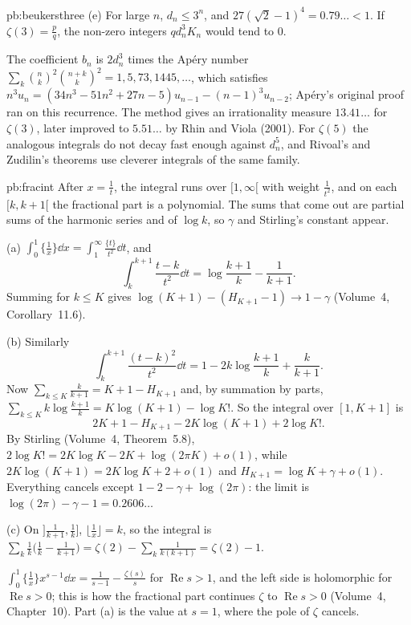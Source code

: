 \begin{solution}{pb:beukersthree}
(e) For large $n$, $d_n\le3^n$, and $27(\sqrt2-1)^4=0.79\ldots<1$. If $\zeta(3)=\frac pq$, the non-zero integers $qd_n^3K_n$ would tend to $0$.

\leads The coefficient $b_n$ is $2d_n^3$ times the Apéry number $\sum_k\binom nk^2\binom{n+k}k^2=1,5,73,1445,\dots$, which satisfies
$n^3u_n=(34n^3-51n^2+27n-5)u_{n-1}-(n-1)^3u_{n-2}$; Apéry's original proof ran on this recurrence. The method gives an irrationality
measure $13.41\ldots$ for $\zeta(3)$, later improved to $5.51\ldots$ by Rhin and Viola (2001). For $\zeta(5)$ the analogous integrals do
not decay fast enough against $d_n^5$, and Rivoal's and Zudilin's theorems use cleverer integrals of the same family.
\end{solution}

\begin{solution}{pb:fracint}
\idea After $x=\frac1t$, the integral runs over $[1,\infty[$ with weight $\frac1{t^2}$, and on each $[k,k+1[$ the fractional part is a
polynomial. The sums that come out are partial sums of the harmonic series and of $\log k$, so $\gamma$ and Stirling's constant appear.

\writeup (a) $\int_0^1\{\frac1x\}\dd x=\int_1^\infty\frac{\{t\}}{t^2}\dd t$, and
\[
\int_k^{k+1}\frac{t-k}{t^2}\dd t=\log\frac{k+1}k-\frac1{k+1}.
\]
Summing for $k\le K$ gives $\log(K+1)-(H_{K+1}-1)\to1-\gamma$ (Volume~4, Corollary~11.6).

(b) Similarly
\[
\int_k^{k+1}\frac{(t-k)^2}{t^2}\dd t=1-2k\log\frac{k+1}k+\frac k{k+1}.
\]
Now $\sum_{k\le K}\frac k{k+1}=K+1-H_{K+1}$ and, by summation by parts,
$\sum_{k\le K}k\log\frac{k+1}k=K\log(K+1)-\log K!$. So the integral over $[1,K+1]$ is
\[
2K+1-H_{K+1}-2K\log(K+1)+2\log K!.
\]
By Stirling (Volume~4, Theorem~5.8), $2\log K!=2K\log K-2K+\log(2\pi K)+o(1)$, while $2K\log(K+1)=2K\log K+2+o(1)$ and $H_{K+1}=\log K+\gamma+o(1)$.
Everything cancels except $1-2-\gamma+\log(2\pi)$: the limit is $\log(2\pi)-\gamma-1=0.2606\ldots$

(c) On $]\frac1{k+1},\frac1k]$, $\lfloor\frac1x\rfloor=k$, so the integral is $\sum_k\frac1k\bigl(\frac1k-\frac1{k+1}\bigr)=\zeta(2)-\sum_k\frac1{k(k+1)}=\zeta(2)-1$.

\leads $\int_0^1\{\frac1x\}x^{s-1}\dd x=\frac1{s-1}-\frac{\zeta(s)}s$ for $\operatorname{Re}s>1$, and the left side is holomorphic for $\operatorname{Re}s>0$; this is how the
fractional part continues $\zeta$ to $\operatorname{Re}s>0$ (Volume~4, Chapter~10). Part (a) is the value at $s=1$, where the pole of $\zeta$ cancels.
\end{solution}

